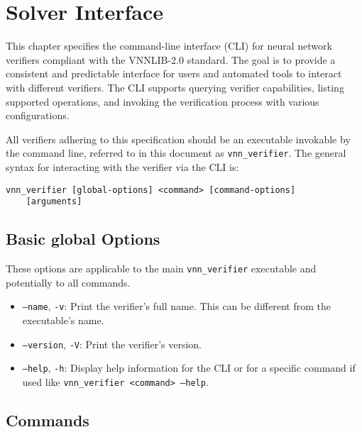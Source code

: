 \chapter{Solver Interface}
\label{sec:solver_interface}

This chapter specifies the command-line interface (CLI) for neural network verifiers compliant with the VNNLIB-2.0 standard. The goal is to provide a consistent and 
predictable interface for users and automated tools to interact with different verifiers. The CLI supports querying verifier capabilities, listing supported operations, 
and invoking the verification process with various configurations.

All verifiers adhering to this specification should be an executable invokable by the command line, referred to in this document as \texttt{vnn\_verifier}. The general syntax for interacting with the verifier via the CLI is:
\begin{lstlisting}[style=bash, numbers=none, frame=none, backgroundcolor=\color{white}]
vnn_verifier [global-options] <command> [command-options] 
	[arguments] 
\end{lstlisting}


\section{Basic global Options}
These options are applicable to the main \texttt{vnn\_verifier} executable and potentially to all commands.
\begin{itemize}
    \item \texttt{--name}, \texttt{-v}: Print the verifier's full name. This can be different from the executable's name.
    \item \texttt{--version}, \texttt{-V}: Print the verifier's version.
    \item \texttt{--help}, \texttt{-h}: Display help information for the CLI or for a specific command if used like \texttt{vnn\_verifier <command> --help}.
\end{itemize}

\section{Commands}

